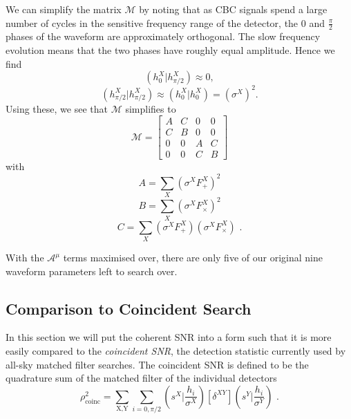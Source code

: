 \documentclass[11pt]{cuthesis}
\newcommand{\fs}{\text{ .}}
\begin{document}
We can simplify the matrix $\mathcal{M}$ by noting that as CBC signals spend a large number of cycles in the sensitive frequency range of the detector, the $0$ and $\frac{\pi}{2}$ phases of the waveform are approximately orthogonal. The slow frequency evolution means that the two phases have roughly equal amplitude. Hence we find 
\begin{equation}
(h_0^X|h_{\pi/2}^X)\approx 0 ,
\end{equation}
\begin{equation}
(h_{\pi/2}^X|h_{\pi/2}^X)\approx (h_0^X|h_0^X) = (\sigma^X)^2 \textbf{.}
\end{equation}
Using these, we see that $\mathcal{M}$  simplifies to
\[
\mathcal{M}
=
\begin{bmatrix}
A & C & 0 & 0 \\
C & B & 0 & 0 \\
0 & 0 & A & C \\
0 & 0 & C & B 
\end{bmatrix}
\] 
with 
\begin{equation}
A = \sum_X (\sigma^X F_+^X)^2
\end{equation}
\begin{equation}
B = \sum_X (\sigma^X F_\times^X)^2
\end{equation}
\begin{equation} \label{C eqn}
C = \sum_X (\sigma^X F_+^X)(\sigma^X F_\times^X) \fs
\end{equation}

With the  $\mathcal{A}^\mu$ terms maximised over, there are only five of our original nine waveform parameters left to search over. 

\subsection{Comparison to Coincident Search} \label{sec: coinc compare}
In this section we will put the coherent SNR into a form such that it is more easily compared to the \textit{coincident SNR}, the detection statistic currently used by all-sky matched filter searches. The coincident SNR is defined to be the quadrature sum of the matched filter of the individual detectors
\begin{equation} \label{rhocoinc}
\rho^2_\text{coinc} = \sum_\text{X,Y} \sum_{i=0,\pi/2} \left( s^X \bigg| \frac{h_i}{\sigma^X} \right)[\delta^{XY}]\left( s^Y \bigg| \frac{h_i}{\sigma^Y} \right) \fs
\end{equation}
\end{document}
